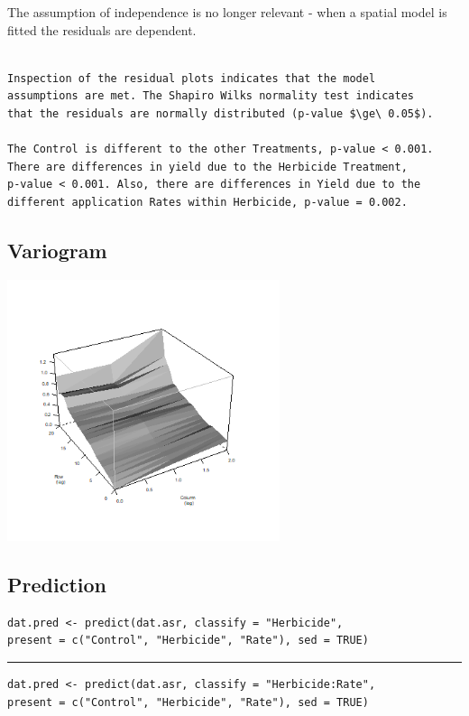 \documentclass[a4paper, 10pt, fleqn, twosided]{memoir}
\begin{document}
The assumption of independence is no longer relevant - when a spatial model is fitted the residuals are dependent.

\begin{tcolorbox}[title = Example 7 Output Interpretation]
\begin{verbatim}

Inspection of the residual plots indicates that the model
assumptions are met. The Shapiro Wilks normality test indicates
that the residuals are normally distributed (p-value $\ge\ 0.05$).

The Control is different to the other Treatments, p-value < 0.001.
There are differences in yield due to the Herbicide Treatment,
p-value < 0.001. Also, there are differences in Yield due to the
different application Rates within Herbicide, p-value = 0.002.
\end{verbatim}
\end{tcolorbox}


\subsection{Variogram}


\begin{tcolorbox}[title = Example 7 Variogram]
\includegraphics[width=0.6\textwidth, frame]{Example6Variogram.png}
\end{tcolorbox}


\subsection{Prediction}

\begin{tcolorbox}[title = Example 7 predicted values]
\begin{verbatim}
dat.pred <- predict(dat.asr, classify = "Herbicide",
present = c("Control", "Herbicide", "Rate"), sed = TRUE)
\end{verbatim}
{\color{code} {\hrule height 1pt}}
\begin{verbatim}
dat.pred <- predict(dat.asr, classify = "Herbicide:Rate",
present = c("Control", "Herbicide", "Rate"), sed = TRUE)
\end{verbatim}
\end{tcolorbox}
\end{document}
